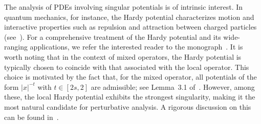 \documentclass[11pt]{article}
\begin{document}
The analysis of PDEs involving singular potentials is of intrinsic interest. In quantum mechanics, for instance, the Hardy potential characterizes motion and interactive properties such as repulsion and attraction between charged particles (see~\cite{frank_hardy_applications}). For a comprehensive treatment of the Hardy potential and its wide-ranging applications, we refer the interested reader to the monograph~\cite{peral_hardy_applications}. It is worth noting that in the context of mixed operators, the Hardy potential is typically chosen to coincide with that associated with the local operator. This choice is motivated by the fact that, for the mixed operator, all potentials of the form \( |x|^{-t} \) with \( t \in [2s, 2] \) are admissible; see Lemma~3.1 of~\cite{malhotra2025eigenvalues}. However, among these, the local Hardy potential exhibits the strongest singularity, making it the most natural candidate for perturbative analysis. A rigorous discussion on this can be found in~\cite{biagi2024mixed_hardy}.
\end{document}
